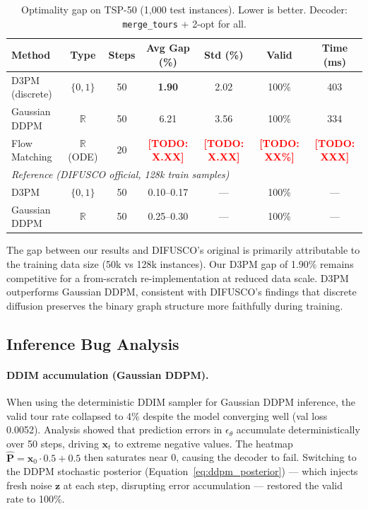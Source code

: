 \documentclass[11pt,a4paper]{article}
\newcommand{\TODO}[1]{\textcolor{red}{\textbf{[TODO: #1]}}}
\begin{document}
\begin{table}[h]
\centering
\caption{Optimality gap on TSP-50 (1{,}000 test instances). Lower is better.
Decoder: \texttt{merge\_tours} + 2-opt for all.}
\label{tab:main}
\begin{tabular}{lcccccc}
\toprule
Method & Type & Steps & Avg Gap (\%) & Std (\%) & Valid & Time (ms) \\
\midrule
D3PM (discrete) & $\{0,1\}$ & 50 & \textbf{1.90} & 2.02 & 100\% & 403 \\
Gaussian DDPM   & $\mathbb{R}$ & 50 & 6.21 & 3.56 & 100\% & 334 \\
Flow Matching   & $\mathbb{R}$ (ODE) & 20 & \TODO{X.XX} & \TODO{X.XX} & \TODO{XX\%} & \TODO{XXX} \\
\midrule
\multicolumn{7}{l}{\textit{Reference (DIFUSCO official, 128k train samples)}} \\
D3PM            & $\{0,1\}$ & 50 & 0.10--0.17 & — & 100\% & — \\
Gaussian DDPM   & $\mathbb{R}$ & 50 & 0.25--0.30 & — & 100\% & — \\
\bottomrule
\end{tabular}
\end{table}

The gap between our results and DIFUSCO's original is primarily attributable to the
training data size (50k vs 128k instances). Our D3PM gap of 1.90\% remains competitive
for a from-scratch re-implementation at reduced data scale.
D3PM outperforms Gaussian DDPM, consistent with DIFUSCO's findings that discrete
diffusion preserves the binary graph structure more faithfully during training.

\subsection{Inference Bug Analysis}
\label{sec:bugs}

\paragraph{DDIM accumulation (Gaussian DDPM).}
When using the deterministic DDIM sampler for Gaussian DDPM inference, the valid tour rate
collapsed to 4\% despite the model converging well (val loss 0.0052). Analysis showed that
prediction errors in $\epsilon_\theta$ accumulate deterministically over 50 steps, driving
$\mathbf{x}_t$ to extreme negative values. The heatmap $\hat{\mathbf{P}} = \mathbf{x}_0\cdot 0.5+0.5$
then saturates near 0, causing the decoder to fail. Switching to the DDPM stochastic posterior
(Equation~\ref{eq:ddpm_posterior}) — which injects fresh noise $\mathbf{z}$ at each step,
disrupting error accumulation — restored the valid rate to 100\%.
\end{document}
